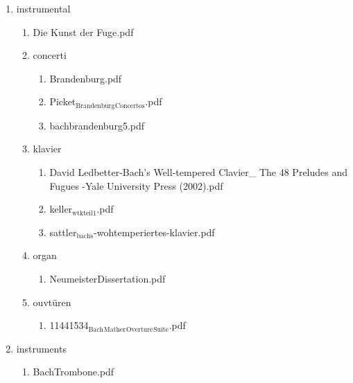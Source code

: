 \documentclass[11pt]{article}
\begin{document}
\begin{enumerate}
\begin{enumerate}
\item instrumental
\label{sec-1-1-1-1-31-7-2-4}
\begin{enumerate}
\item Die Kunst der Fuge.pdf
\label{sec-1-1-1-1-31-7-2-4-1}

\item concerti
\label{sec-1-1-1-1-31-7-2-4-2}
\begin{enumerate}
\item Brandenburg.pdf
\label{sec-1-1-1-1-31-7-2-4-2-1}

\item Picket$_{\text{Brandenburg}}$$_{\text{Concertos}}$.pdf
\label{sec-1-1-1-1-31-7-2-4-2-2}

\item bachbrandenburg5.pdf
\label{sec-1-1-1-1-31-7-2-4-2-3}
\end{enumerate}

\item klavier
\label{sec-1-1-1-1-31-7-2-4-3}
\begin{enumerate}
\item David Ledbetter-Bach's Well-tempered Clavier\_ The 48 Preludes and Fugues  -Yale University Press (2002).pdf
\label{sec-1-1-1-1-31-7-2-4-3-1}

\item keller$_{\text{wtkteil1}}$.pdf
\label{sec-1-1-1-1-31-7-2-4-3-2}

\item sattler$_{\text{bachs}}$-wohtemperiertes-klavier.pdf
\label{sec-1-1-1-1-31-7-2-4-3-3}
\end{enumerate}

\item organ
\label{sec-1-1-1-1-31-7-2-4-4}
\begin{enumerate}
\item NeumeisterDissertation.pdf
\label{sec-1-1-1-1-31-7-2-4-4-1}
\end{enumerate}

\item ouvtüren
\label{sec-1-1-1-1-31-7-2-4-5}
\begin{enumerate}
\item 11441534$_{\text{Bach}}$$_{\text{Mather}}$$_{\text{Overture}}$$_{\text{Suite}}$.pdf
\label{sec-1-1-1-1-31-7-2-4-5-1}
\end{enumerate}
\end{enumerate}

\item instruments
\label{sec-1-1-1-1-31-7-2-5}
\begin{enumerate}
\item BachTrombone.pdf
\label{sec-1-1-1-1-31-7-2-5-1}
\end{enumerate}


\end{enumerate}
\end{enumerate}
\end{document}
